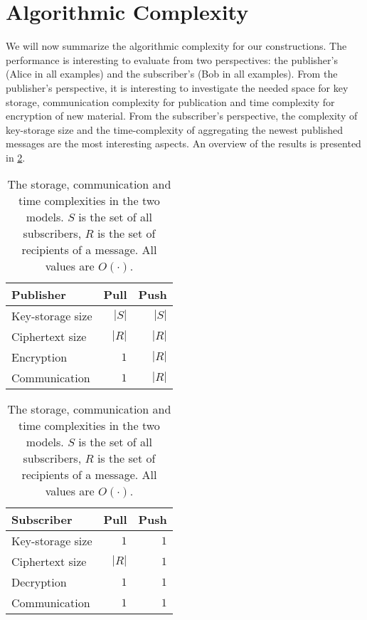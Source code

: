 \section{Algorithmic Complexity}\label{AlgComplexity}

We will now summarize the algorithmic complexity for our constructions.
The performance is interesting to evaluate from two perspectives: the 
publisher's (Alice in all examples) and the subscriber's (Bob in all examples).
From the publisher's perspective, it is interesting to investigate the needed 
space for key storage, communication complexity for publication and time 
complexity for encryption of new material.
From the subscriber's perspective, the complexity of key-storage size and the 
time-complexity of aggregating the newest published messages are the most 
interesting aspects.
An overview of the results is presented in \cref{Complexities}.

\begin{table}
  \centering
  \caption{%
    The storage, communication and time complexities in the two models.
    \(S\) is the set of all subscribers, \(R\) is the set of recipients of 
    a message.
    All values are \(O(\cdot)\).
  }\label{Complexities}
  \begin{tabular}{lrr}
    \toprule

    Publisher
    & Pull & Push \\
    
    \midrule

    Key-storage size
    & \(|S|\) & \(|S|\) \\

    \pause{}%
    Ciphertext size
    & \(|R|\) & \(|R|\) \\

    Encryption
    & \(1\) & \(|R|\) \\

    \pause{}%
    Communication
    & \(1\) & \(|R|\) \\

    \bottomrule

  \end{tabular}
  \begin{tabular}{lrr}
    \toprule

    Subscriber
    & Pull & Push \\
    
    \midrule

    Key-storage size
    & \(1\) & \(1\) \\

    \pause{}%
    Ciphertext size
    & \(|R|\) & \(1\) \\

    Decryption
    & \(1\) & \(1\) \\

    \pause{}%
    Communication
    & \(1\) & \(1\) \\

    \bottomrule

  \end{tabular}
\end{table}

